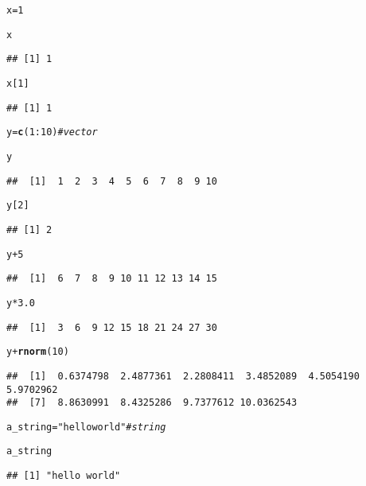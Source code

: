\documentclass[a4paper,10pt]{book}\usepackage[]{graphicx}\usepackage[]{color}
\makeatletter
\newcommand{\hlnum}[1]{\textcolor[rgb]{0.686,0.059,0.569}{#1}}%
\newcommand{\hlstr}[1]{\textcolor[rgb]{0.192,0.494,0.8}{#1}}%
\newcommand{\hlcom}[1]{\textcolor[rgb]{0.678,0.584,0.686}{\textit{#1}}}%
\newcommand{\hlopt}[1]{\textcolor[rgb]{0,0,0}{#1}}%
\newcommand{\hlstd}[1]{\textcolor[rgb]{0.345,0.345,0.345}{#1}}%
\newcommand{\hlkwb}[1]{\textcolor[rgb]{0.69,0.353,0.396}{#1}}%
\newcommand{\hlkwd}[1]{\textcolor[rgb]{0.737,0.353,0.396}{\textbf{#1}}}%
\newenvironment{kframe}{%
 \def\at@end@of@kframe{}%
 \ifinner\ifhmode%
  \def\at@end@of@kframe{\end{minipage}}%
  \begin{minipage}{\columnwidth}%
 \fi\fi%
 \def\FrameCommand##1{\hskip\@totalleftmargin \hskip-\fboxsep
 \colorbox{shadecolor}{##1}\hskip-\fboxsep
     \hskip-\linewidth \hskip-\@totalleftmargin \hskip\columnwidth}%
 \MakeFramed {\advance\hsize-\width
   \@totalleftmargin\z@ \linewidth\hsize
   \@setminipage}}%
 {\par\unskip\endMakeFramed%
 \at@end@of@kframe}
\newenvironment{knitrout}{}{} %
\makeatother
\begin{document}
\begin{knitrout}
\color{fgcolor}\begin{kframe}
\begin{alltt}
\hlstd{x} \hlkwb{=} \hlnum{1}

\hlstd{x}
\end{alltt}
\begin{verbatim}
## [1] 1
\end{verbatim}
\begin{alltt}
\hlstd{x[}\hlnum{1}\hlstd{]}
\end{alltt}
\begin{verbatim}
## [1] 1
\end{verbatim}
\begin{alltt}
\hlstd{y} \hlkwb{=} \hlkwd{c}\hlstd{(}\hlnum{1}\hlopt{:}\hlnum{10}\hlstd{)} \hlcom{# vector}

\hlstd{y}
\end{alltt}
\begin{verbatim}
##  [1]  1  2  3  4  5  6  7  8  9 10
\end{verbatim}
\begin{alltt}
\hlstd{y[}\hlnum{2}\hlstd{]}
\end{alltt}
\begin{verbatim}
## [1] 2
\end{verbatim}
\begin{alltt}
\hlstd{y} \hlopt{+} \hlnum{5}
\end{alltt}
\begin{verbatim}
##  [1]  6  7  8  9 10 11 12 13 14 15
\end{verbatim}
\begin{alltt}
\hlstd{y} \hlopt{*} \hlnum{3.0}
\end{alltt}
\begin{verbatim}
##  [1]  3  6  9 12 15 18 21 24 27 30
\end{verbatim}
\begin{alltt}
\hlstd{y} \hlopt{+} \hlkwd{rnorm}\hlstd{(}\hlnum{10}\hlstd{)}
\end{alltt}
\begin{verbatim}
##  [1]  0.6374798  2.4877361  2.2808411  3.4852089  4.5054190  5.9702962
##  [7]  8.8630991  8.4325286  9.7377612 10.0362543
\end{verbatim}
\begin{alltt}
\hlstd{a_string} \hlkwb{=} \hlstr{"hello world"} \hlcom{# string}

\hlstd{a_string}
\end{alltt}
\begin{verbatim}
## [1] "hello world"
\end{verbatim}
\end{kframe}
\end{knitrout}
\end{document}
